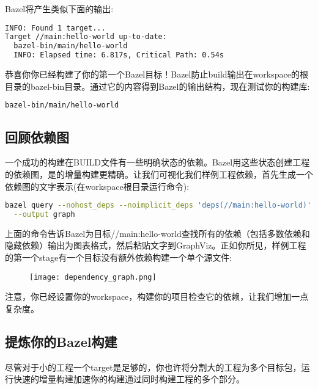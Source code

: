 Bazel将产生类似下面的输出:
\begin{lstlisting}[language=Bash]
INFO: Found 1 target...
Target //main:hello-world up-to-date:
  bazel-bin/main/hello-world
  INFO: Elapsed time: 6.817s, Critical Path: 0.54s
\end{lstlisting}
恭喜你你已经构建了你的第一个Bazel目标！Bazel防止build输出在workspace的根目录的bazel-bin目录。通过它的内容得到Bazel的输出结构，现在测试你的构建库:
\begin{lstlisting}[language=Bash]
bazel-bin/main/hello-world
\end{lstlisting}
\subsection{回顾依赖图}
一个成功的构建在BUILD文件有一些明确状态的依赖。Bazel用这些状态创建工程的依赖图，是的增量构建更精确。让我们可视化我们样例工程依赖，首先生成一个依赖图的文字表示(在workspace根目录运行命令):
\begin{lstlisting}[language=Bash]
bazel query --nohost_deps --noimplicit_deps 'deps(//main:hello-world)' \
  --output graph
\end{lstlisting}
上面的命令告诉Bazel为目标//main:hello-world查找所有的依赖（包括多数依赖和隐藏依赖）输出为图表格式，然后粘贴文字到GraphViz。正如你所见，样例工程的第一个stage有一个目标没有额外依赖构建一个单个源文件:
\begin{figure}[H]
	\texttt{[image: dependency\_graph.png]}
\end{figure}
注意，你已经设置你的workspace，构建你的项目检查它的依赖，让我们增加一点复杂度。
\subsection{提炼你的Bazel构建}
尽管对于小的工程一个target是足够的，你也许将分割大的工程为多个目标包，运行快速的增量构建加速你的构建通过同时构建工程的多个部分。
